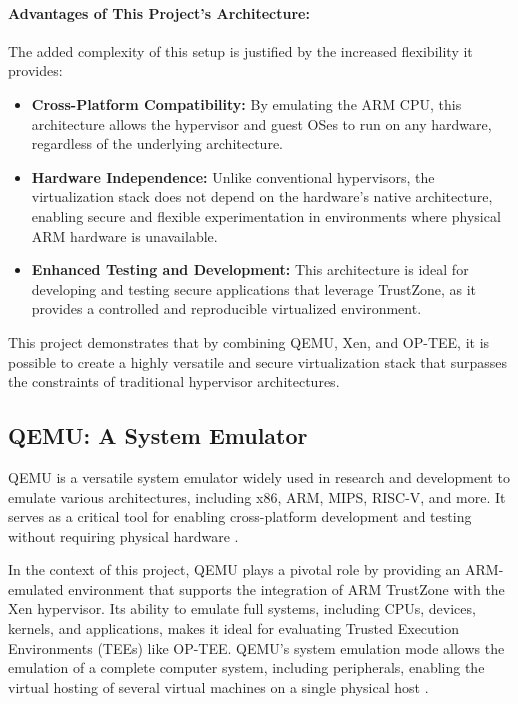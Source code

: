 \documentclass[acmtog]{acmart}
\begin{document}
\paragraph{Advantages of This Project's Architecture:}
The added complexity of this setup is justified by the increased flexibility it provides:
\begin{itemize}
    \item \textbf{Cross-Platform Compatibility:} By emulating the ARM CPU, this architecture allows the hypervisor and guest OSes to run on any hardware, regardless of the underlying architecture.
    \item \textbf{Hardware Independence:} Unlike conventional hypervisors, the virtualization stack does not depend on the hardware's native architecture, enabling secure and flexible experimentation in environments where physical ARM hardware is unavailable.
    \item \textbf{Enhanced Testing and Development:} This architecture is ideal for developing and testing secure applications that leverage TrustZone, as it provides a controlled and reproducible virtualized environment.
\end{itemize}

This project demonstrates that by combining QEMU, Xen, and OP-TEE, it is possible to create a highly versatile and secure virtualization stack that surpasses the constraints of traditional hypervisor architectures.


\subsection{QEMU: A System Emulator}
QEMU is a versatile system emulator widely used in research and development to emulate various architectures, including x86, ARM, MIPS, RISC-V, and more. It serves as a critical tool for enabling cross-platform development and testing without requiring physical hardware \cite{efficient_virtualization, partemu, qemu_fast_portable}. \cite{10.5555/1247360.1247401}

In the context of this project, QEMU plays a pivotal role by providing an ARM-emulated environment that supports the integration of ARM TrustZone with the Xen hypervisor. Its ability to emulate full systems, including CPUs, devices, kernels, and applications, makes it ideal for evaluating Trusted Execution Environments (TEEs) like OP-TEE. QEMU's system emulation mode allows the emulation of a complete computer system, including peripherals, enabling the virtual hosting of several virtual machines on a single physical host \cite{efficient_virtualization}.
\end{document}

